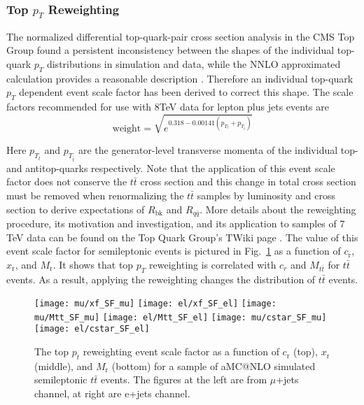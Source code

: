 \documentclass{cmspaperpdf}
\begin{document}
\subsubsection{Top $p_{T}$ Reweighting}

The normalized differential top-quark-pair cross section analysis in the CMS Top Group found a persistent inconsistency between the shapes of the individual top-quark $p_{T}$ distributions in simulation and data, while the NNLO approximated calculation \cite{Kidonakis2012} provides a reasonable description \cite{pT_reweighting_TWiki}. Therefore an individual top-quark $p_{T}$ dependent event scale factor has been derived to correct this shape. The scale factors recommended for use with 8TeV data for lepton plus jets events are 
\begin{equation}
\mathrm{weight} = \sqrt{e^{0.318-0.00141(p_{T_{t}}+p_{T_{\bar{t}}})}}
\end{equation}

Here $p_{T_t}$ and $p_{T_{\bar t}}$ are the generator-level transverse momenta of the individual top- and antitop-quarks respectively. Note that the application of this event scale factor does not conserve the $t\bar{t}$ cross section and this change in total cross section must be removed when renormalizing the $t\bar{t}$ samples by luminosity and cross section to derive expectations of $R_\mathrm{bk}$ and $R_{q\bar q}$. More details about the reweighting procedure, its motivation and investigation, and its application to samples of 7 TeV data can be found on the Top Quark Group's TWiki page \cite{pT_reweighting_TWiki}. The value of this event scale factor for semileptonic events is pictured in Fig.~\ref{fig:top_pT_SF} as a function of $c_\mathrm{r}$, $x_\mathrm{r}$, and $M_\mathrm{r}$. It shows that top $p_T$ reweighting is correlated with $c_r$ and $M_{t\bar t}$ for $t\bar{t}$ events. As a result, applying the reweighting changes the distribution of $t\bar{t}$ events.

\begin{figure}[hbt]
  \begin{center}
    \texttt{[image: mu/xf\_SF\_mu]}
    \texttt{[image: el/xf\_SF\_el]}   
    \texttt{[image: mu/Mtt\_SF\_mu]}
    \texttt{[image: el/Mtt\_SF\_el]}
    \texttt{[image: mu/cstar\_SF\_mu]}
    \texttt{[image: el/cstar\_SF\_el]}
  \caption{\small The top $p_{t}$ reweighting event scale factor as a function of $c_\mathrm{r}$ (top), $x_\mathrm{r}$ (middle), and $M_\mathrm{r}$ (bottom) for a sample of aMC@NLO simulated semileptonic $t\bar{t}$ events.  The figures at the left are from $\mu$+jets channel, at right are e+jets channel.}
    \label{fig:top_pT_SF}
  \end{center}
\end{figure}
\end{document}
